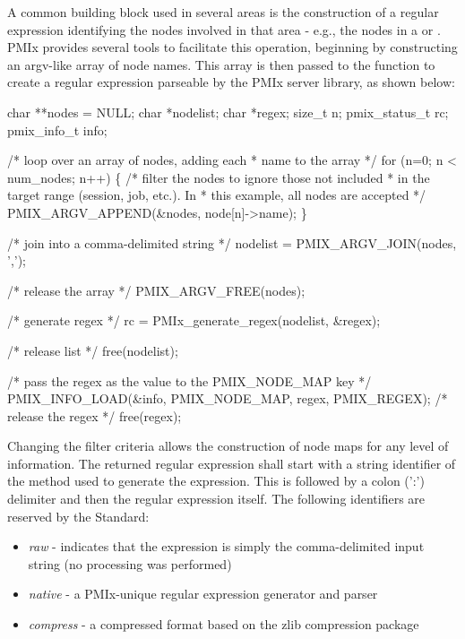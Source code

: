 \label{cptr:api_server:noderegex}A common building block used in several areas is the construction of a regular expression identifying the nodes involved in that area - e.g., the nodes in a  or . \ac{PMIx} provides several tools to facilitate this operation, beginning by constructing an argv-like array of node names. This array is then passed to the  function to create a regular expression parseable by the \ac{PMIx} server library, as shown below:

\cspecificstart
\begin{codepar}
char **nodes = NULL;
char *nodelist;
char *regex;
size_t n;
pmix_status_t rc;
pmix_info_t info;

/* loop over an array of nodes, adding each
 * name to the array */
for (n=0; n < num_nodes; n++) \{
    /* filter the nodes to ignore those not included
     * in the target range (session, job, etc.). In
     * this example, all nodes are accepted */
    PMIX_ARGV_APPEND(&nodes, node[n]->name);
\}

/* join into a comma-delimited string */
nodelist = PMIX_ARGV_JOIN(nodes, ',');

/* release the array */
PMIX_ARGV_FREE(nodes);

/* generate regex */
rc = PMIx_generate_regex(nodelist, &regex);

/* release list */
free(nodelist);

/* pass the regex as the value to the PMIX_NODE_MAP key */
PMIX_INFO_LOAD(&info, PMIX_NODE_MAP, regex, PMIX_REGEX);
/* release the regex */
free(regex);
\end{codepar}
\cspecificend

Changing the filter criteria allows the construction of node maps for any level of information. The returned regular expression shall start with a string identifier of the method used to generate the expression. This is followed by a colon (':') delimiter and then the regular expression itself. The following identifiers are reserved by the Standard:

\begin{itemize}
    \item \emph{raw} - indicates that the expression is simply the comma-delimited input string (no processing was performed)
    \item \emph{native} - a \ac{PMIx}-unique regular expression generator and parser
    \item \emph{compress} - a compressed format based on the zlib compression package
\end{itemize}


